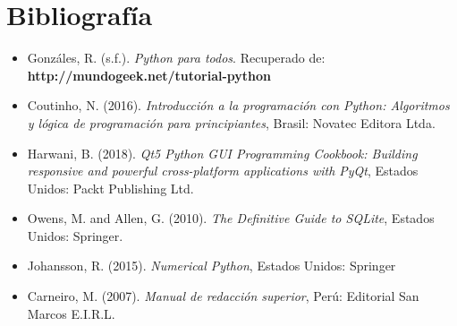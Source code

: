 \documentclass[12pt,a4paper]{report}
\begin{document}
\section{Bibliografía}
\begin{itemize}
	\item Gonzáles, R. (s.f.). \textit{Python para todos}. Recuperado de: \textbf{http://mundogeek.net/tutorial-python}
	\item Coutinho, N. (2016). \textit{Introducción a la programación con Python: Algoritmos y lógica de programación para principiantes}, Brasil: Novatec Editora Ltda.
	\item Harwani, B. (2018). \textit{Qt5 Python GUI Programming Cookbook: Building responsive and powerful cross-platform applications with PyQt}, Estados Unidos: Packt Publishing Ltd.
	\item Owens, M. and Allen, G. (2010). \textit{The Definitive Guide to SQLite}, Estados Unidos: Springer.
	\item Johansson, R. (2015). \textit{Numerical Python}, Estados Unidos: Springer
	\item Carneiro, M. (2007). \textit{Manual de redacción superior}, Perú: Editorial San Marcos E.I.R.L.
\end{itemize}
\end{document}
